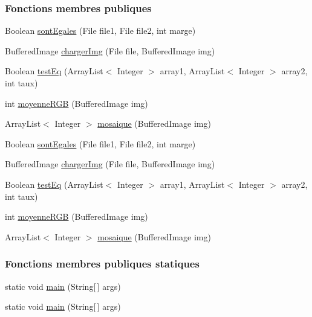 \subsubsection*{Fonctions membres publiques}
\begin{DoxyCompactItemize}
\item 
Boolean \hyperlink{classPictures_1_1Reconnaissance_a8d665e26d86686cb6c38f11befcefc2b}{sont\+Egales} (File file1, File file2, int marge)
\item 
Buffered\+Image \hyperlink{classPictures_1_1Reconnaissance_a21423c9a85619de9330b6a3533e4367d}{charger\+Img} (File file, Buffered\+Image img)
\item 
Boolean \hyperlink{classPictures_1_1Reconnaissance_aaa10f9e195c2a51600c61b4b2f2c11cf}{test\+Eq} (Array\+List$<$ Integer $>$ array1, Array\+List$<$ Integer $>$ array2, int taux)
\item 
int \hyperlink{classPictures_1_1Reconnaissance_a5171a0dedfd6b5c4a518a04a5f61b6ce}{moyenne\+R\+G\+B} (Buffered\+Image img)
\item 
Array\+List$<$ Integer $>$ \hyperlink{classPictures_1_1Reconnaissance_a8df9b1cc5c8a74bbf263f72b7825a924}{mosaique} (Buffered\+Image img)
\item 
Boolean \hyperlink{classPictures_1_1Reconnaissance_a8d665e26d86686cb6c38f11befcefc2b}{sont\+Egales} (File file1, File file2, int marge)
\item 
Buffered\+Image \hyperlink{classPictures_1_1Reconnaissance_a21423c9a85619de9330b6a3533e4367d}{charger\+Img} (File file, Buffered\+Image img)
\item 
Boolean \hyperlink{classPictures_1_1Reconnaissance_aaa10f9e195c2a51600c61b4b2f2c11cf}{test\+Eq} (Array\+List$<$ Integer $>$ array1, Array\+List$<$ Integer $>$ array2, int taux)
\item 
int \hyperlink{classPictures_1_1Reconnaissance_a5171a0dedfd6b5c4a518a04a5f61b6ce}{moyenne\+R\+G\+B} (Buffered\+Image img)
\item 
Array\+List$<$ Integer $>$ \hyperlink{classPictures_1_1Reconnaissance_a8df9b1cc5c8a74bbf263f72b7825a924}{mosaique} (Buffered\+Image img)
\end{DoxyCompactItemize}
\subsubsection*{Fonctions membres publiques statiques}
\begin{DoxyCompactItemize}
\item 
static void \hyperlink{classPictures_1_1Reconnaissance_ade4458f15b224255506801a731a042a0}{main} (String\mbox{[}$\,$\mbox{]} args)
\item 
static void \hyperlink{classPictures_1_1Reconnaissance_ade4458f15b224255506801a731a042a0}{main} (String\mbox{[}$\,$\mbox{]} args)
\end{DoxyCompactItemize}



